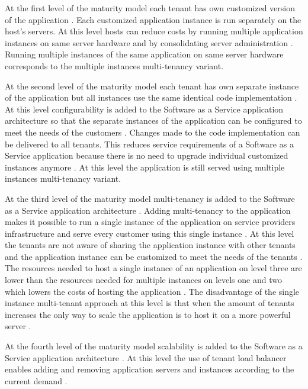 \documentclass[conference]{sasmoota2017}
\begin{document}
At the first level of the maturity model each tenant has own customized version of the application \cite{Carraro:2006:ArchitectureLongTail}. Each customized application instance is run separately on the host’s servers. At this level hosts can reduce costs by running multiple application instances on same server hardware and by consolidating server administration \cite{Carraro:2006:ArchitectureLongTail}. Running multiple instances of the same application on same server hardware corresponds to the multiple instances multi-tenancy variant. 

At the second level of the maturity model each tenant has own separate instance of the application but all instances use the same identical code implementation \cite{Carraro:2006:ArchitectureLongTail}. At this level configurability is added to the Software as a Service application architecture so that the separate instances of the application can be configured to meet the needs of the customers \cite{Carraro:2006:ArchitectureLongTail}. Changes made to the code implementation can be delivered to all tenants. This reduces service requirements of a Software as a Service application because there is no need to upgrade individual customized instances anymore \cite{Carraro:2006:ArchitectureLongTail}. At this level the application is still served using multiple instances multi-tenancy variant.

At the third level of the maturity model multi-tenancy is added to the Software as a Service application architecture \cite{Carraro:2006:ArchitectureLongTail}. Adding multi-tenancy to the application makes it possible to run a single instance of the application on service providers infrastructure and serve every customer using this single instance \cite{Carraro:2006:ArchitectureLongTail}. At this level the tenants are not aware of sharing the application instance with other tenants and the application instance can be customized to meet the needs of the tenants \cite{Carraro:2006:ArchitectureLongTail}. The resources needed to host a single instance of an application on level three are lower than the resources needed for multiple instances on levels one and two which lowers the costs of hosting the application \cite{Carraro:2006:ArchitectureLongTail}. The disadvantage of the single instance multi-tenant approach at this level is that when the amount of tenants increases the only way to scale the application is to host it on a more powerful server \cite{Carraro:2006:ArchitectureLongTail}. 

At the fourth level of the maturity model scalability is added to the Software as a Service application architecture \cite{Carraro:2006:ArchitectureLongTail}. At this level the use of tenant load balancer enables adding and removing application servers and instances according to the current demand \cite{Carraro:2006:ArchitectureLongTail}.
\end{document}
